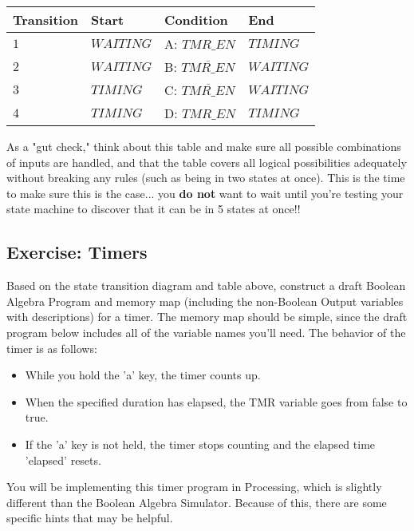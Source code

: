 \documentclass[11pt]{article}
\providecommand{\tightlist}{%
      \setlength{\itemsep}{0pt}\setlength{\parskip}{0pt}}
\begin{document}
\begin{longtable}[]{@{}llll@{}}
\toprule
Transition & Start & Condition & End\tabularnewline
\midrule
\endhead
\(1\) & \(WAITING\) & A: \(TMR\_EN\) & \(TIMING\)\tabularnewline
\(2\) & \(WAITING\) & B: \(\overline{TMR\_EN}\) &
\(WAITING\)\tabularnewline
\(3\) & \(TIMING\) & C: \(\overline{TMR\_EN}\) &
\(WAITING\)\tabularnewline
\(4\) & \(TIMING\) & D: \(TMR\_EN\) & \(TIMING\)\tabularnewline
\bottomrule
\end{longtable}

As a "gut check," think about this table and make sure all possible
combinations of inputs are handled, and that the table covers all
logical possibilities adequately without breaking any rules (such as
being in two states at once). This is the time to make sure this is the
case... you \textbf{do not} want to wait until you're testing your state
machine to discover that it can be in 5 states at once!!

    \subsection{Exercise: Timers}\label{exercise-timers}

Based on the state transition diagram and table above, construct a draft
Boolean Algebra Program and memory map (including the non-Boolean Output
variables with descriptions) for a timer. The memory map should be
simple, since the draft program below includes all of the variable names
you'll need. The behavior of the timer is as follows:

\begin{itemize}
\tightlist
\item
  While you hold the 'a' key, the timer counts up.
\item
  When the specified duration has elapsed, the TMR variable goes from
  false to true.
\item
  If the 'a' key is not held, the timer stops counting and the elapsed
  time 'elapsed' resets.
\end{itemize}

You will be implementing this timer program in Processing, which is
slightly different than the Boolean Algebra Simulator. Because of this,
there are some specific hints that may be helpful.
\end{document}
